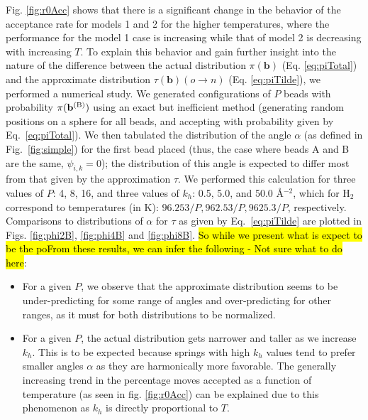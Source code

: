                 Fig. \ref{fig:r0Acc} shows that there is a significant change in the behavior of the acceptance rate for models 1 and 2 for the higher temperatures, where the performance for the model 1 case is increasing while that of model 2 is decreasing with increasing $T$. To explain this behavior and gain further insight into the nature of the difference between the actual distribution $\pi({\mathbf b})$ (Eq. \eqref{eq:piTotal}) and the approximate distribution $\tau({\mathbf b}) (o \to n)$ (Eq. \eqref{eq:piTilde}), we performed a numerical study. We generated configurations of $P$ beads with probability $\pi({\bf{b}}^{\textrm{(B)}})$ using an exact but inefficient method (generating random positions on a sphere for all beads, and accepting with probability given by Eq.~\eqref{eq:piTotal}). We then tabulated the distribution of the angle $\alpha$ (as defined in Fig.~\ref{fig:simple}) for the first bead placed (thus, the case where beads A and B are the same, $\psi_{i,k} = 0$); the distribution of this angle is expected to differ most from that given by the approximation $\tau$. We performed this calculation for three values of $P$: 4, 8, 16, and three values of $k_h$: 0.5, 5.0, and 50.0 \AA$^{-2}$, which for H$_2$ correspond to temperatures (in K): $96.253/P, 962.53/P, 9625.3/P$, respectively. Comparisons to distributions of $\alpha$ for $\tau$ as given by Eq.~\eqref{eq:piTilde}  are plotted in Figs. \ref{fig:phi2B}, \ref{fig:phi4B} and \ref{fig:phi8B}.  \hl{So while we present what is expect to be the poFrom these results, we can infer the following - Not sure what to do here}:
                \begin{itemize}
                    \item For a given $P$, we observe that the approximate distribution seems to be under-predicting for some range of angles and over-predicting for other ranges, as it must for both distributions to be normalized.
                    \item For a given $P$, the actual distribution gets narrower and taller as we increase $k_h$. This is to be expected because springs with high $k_h$ values tend to prefer smaller angles $\alpha$ as they are harmonically more favorable. The generally increasing trend in the percentage moves accepted as a function of temperature (as seen in fig. \ref{fig:r0Acc}) can be explained due to this phenomenon as $k_h$ is directly proportional to $T$.
                \end{itemize}

